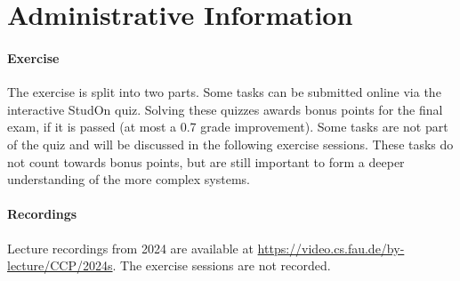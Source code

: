 \section{Administrative Information}
\label{sec:admin}

\paragraph{Exercise}
The exercise is split into two parts.
Some tasks can be submitted online via the interactive StudOn quiz.
Solving these quizzes awards bonus points for the final exam, if it is passed (at most a 0.7 grade improvement).
Some tasks are not part of the quiz and will be discussed in the following exercise sessions.
These tasks do not count towards bonus points, but are still important to form a deeper understanding of the more complex systems.

\paragraph{Recordings}
Lecture recordings from 2024 are available at \url{https://video.cs.fau.de/by-lecture/CCP/2024s}.
The exercise sessions are not recorded.